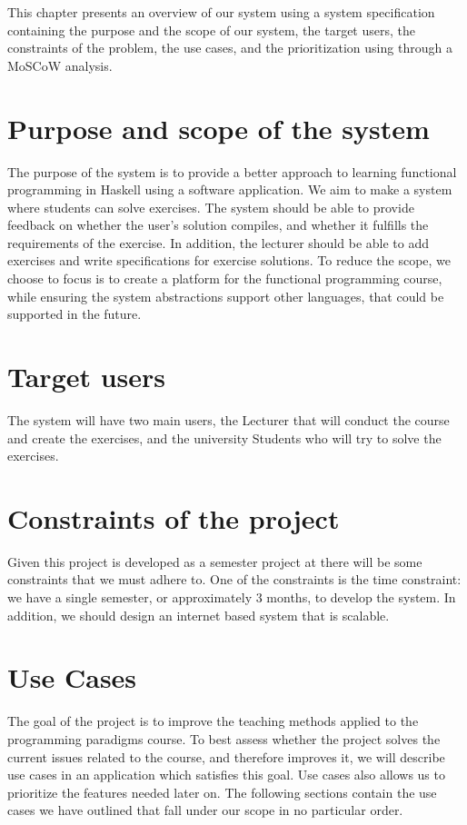 This chapter presents an overview of our system using a system specification containing the purpose and the scope of our system, the target users, the constraints of the problem, the use cases, and the prioritization using through a MoSCoW analysis.

\section*{Purpose and scope of the system }
The purpose of the system is to provide a better approach to learning functional programming in Haskell using a software application.
We aim to make a system where students can solve exercises. The system should be able to provide feedback on whether the user's solution compiles, and whether it fulfills the requirements of the exercise. 
In addition, the lecturer should be able to add exercises and write specifications for exercise solutions.
To reduce the scope, we choose to focus is to create a platform for the functional programming course, while ensuring the system abstractions support other languages, that could be supported in the future.

\section*{Target users}
The system will have two main users, the Lecturer that will conduct the course and create the exercises, and the university Students who will try to solve the exercises.


\section*{Constraints of the project}
Given this project is developed as a semester project at \aau{} there will be some constraints that we must adhere to. 
One of the constraints is the time constraint: we have a single semester, or approximately 3 months, to develop the system. 
In addition, we should design an internet based system that is scalable. 
 
\section*{Use Cases} \label{sec:use_cases}
The goal of the project is to improve the teaching methods applied to the programming paradigms course. 
To best assess whether the project solves the current issues related to the course, and therefore improves it, we will describe use cases in an application which satisfies this goal.
Use cases also allows us to prioritize the features needed later on.
The following sections contain the use cases we have outlined that fall under our scope in no particular order.  

